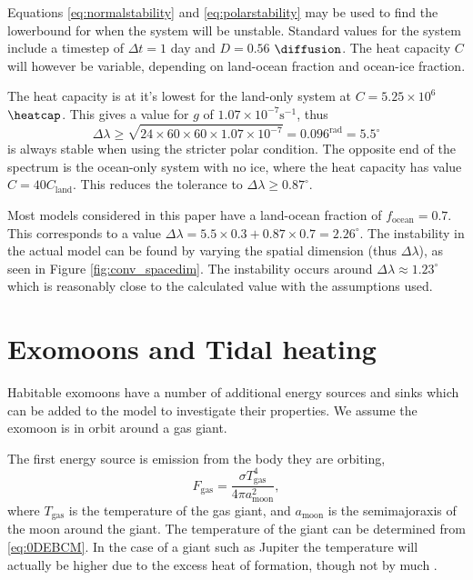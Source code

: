 \documentclass[12pt, onecolumn]{revtex4-2}    %
\begin{document}
Equations \eqref{eq:normalstability} and \eqref{eq:polarstability} may be used to find the lowerbound for when the system will be unstable.
Standard values for the system include a timestep of $\Delta t = 1$ day and $D = 0.56$ $\unit{\diffusion}$.
The heat capacity $C$ will however be variable, depending on land-ocean fraction and ocean-ice fraction.

The heat capacity is at it's lowest for the land-only system at $C=5.25\times10^6$ $\unit{\heatcap}$.
This gives a value for $g$ of $1.07\times10^{-7} \text{s}^{-1}$, thus
\begin{equation*}
    \Delta\lambda \ge \sqrt{24\times60\times60\times1.07\times10^{-7}} = 0.096 ^{\text{rad}} = 5.5 ^{\circ}
\end{equation*}
is always stable when using the stricter polar condition.
The opposite end of the spectrum is the ocean-only system with no ice, where the heat capacity has value $C = 40 C_{\text{land}}$.
This reduces the tolerance to $\Delta\lambda \ge 0.87 ^{\circ}$.

Most models considered in this paper have a land-ocean fraction of $f_{\text{ocean}} = 0.7$.
This corresponds to a value $\Delta\lambda = 5.5 \times 0.3 + 0.87 \times 0.7 = 2.26^{\circ}$.
The instability in the actual model can be found by varying the spatial dimension (thus $\Delta \lambda$), as seen in Figure \ref{fig:conv_spacedim}.
The instability occurs around $\Delta\lambda \approx 1.23^{\circ}$ which is reasonably close to the calculated value with the assumptions used.

\section{Exomoons and Tidal heating} \label{sec:tidal_heating}

Habitable exomoons have a number of additional energy sources and sinks which can be added to the model to investigate their properties.
We assume the exomoon is in orbit around a gas giant.

The first energy source is emission from the body they are orbiting,
\begin{equation}
    F_{\text{gas}} = \frac{\sigma T_{\text{gas}}^4}{4 \pi a_{\text{moon}}^2},
\end{equation}
where $T_{\text{gas}}$ is the temperature of the gas giant, and $a_{\text{moon}}$ is the semimajoraxis of the moon around the giant.
The temperature of the giant can be determined from \eqref{eq:0DEBCM}.
In the case of a giant such as Jupiter the temperature will actually be higher due to the excess heat of formation, though not by much \cite{LJW2018}.
\end{document}
